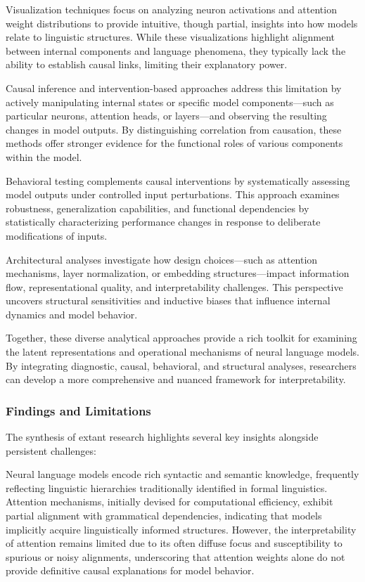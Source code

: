 \documentclass[sigconf]{acmart}
\begin{document}
Visualization techniques focus on analyzing neuron activations and attention weight distributions to provide intuitive, though partial, insights into how models relate to linguistic structures. While these visualizations highlight alignment between internal components and language phenomena, they typically lack the ability to establish causal links, limiting their explanatory power.

Causal inference and intervention-based approaches address this limitation by actively manipulating internal states or specific model components—such as particular neurons, attention heads, or layers—and observing the resulting changes in model outputs. By distinguishing correlation from causation, these methods offer stronger evidence for the functional roles of various components within the model.

Behavioral testing complements causal interventions by systematically assessing model outputs under controlled input perturbations. This approach examines robustness, generalization capabilities, and functional dependencies by statistically characterizing performance changes in response to deliberate modifications of inputs.

Architectural analyses investigate how design choices—such as attention mechanisms, layer normalization, or embedding structures—impact information flow, representational quality, and interpretability challenges. This perspective uncovers structural sensitivities and inductive biases that influence internal dynamics and model behavior.

Together, these diverse analytical approaches provide a rich toolkit for examining the latent representations and operational mechanisms of neural language models. By integrating diagnostic, causal, behavioral, and structural analyses, researchers can develop a more comprehensive and nuanced framework for interpretability.

\subsubsection{Findings and Limitations}

The synthesis of extant research highlights several key insights alongside persistent challenges:

Neural language models encode rich syntactic and semantic knowledge, frequently reflecting linguistic hierarchies traditionally identified in formal linguistics. Attention mechanisms, initially devised for computational efficiency, exhibit partial alignment with grammatical dependencies, indicating that models implicitly acquire linguistically informed structures. However, the interpretability of attention remains limited due to its often diffuse focus and susceptibility to spurious or noisy alignments, underscoring that attention weights alone do not provide definitive causal explanations for model behavior.
\end{document}
